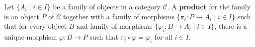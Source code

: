 \begin{definition}
Let $\{A_i \mid i \in I\}$ be a family of objects in a category $\mathcal{C}$. A \textbf{product} for the family is an object $P$ of $\mathcal{C}$ together with a family of morphisms $\{\pi_i : P \rightarrow A_i \mid i \in I\}$ such that for every object $B$ and family of morphisms $\{\varphi_i : B \rightarrow A_i \mid i \in I\}$, there is a unique morphism $\varphi : B \rightarrow P$ such that $\pi_i \circ \varphi = \varphi_i$ for all $i \in I$.
\end{definition}
